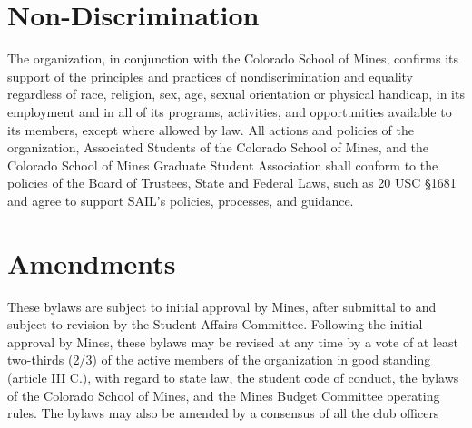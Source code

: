 \documentclass[12pt]{article}
\begin{document}
\section{Non-Discrimination}
{
The organization, in conjunction with the Colorado School of Mines, 
confirms its support of the principles and practices of nondiscrimination and equality regardless of race, 
religion, sex, age, sexual orientation or physical handicap, in its employment and in all of its programs, activities, 
and opportunities available to its members, except where allowed by law. All actions and policies of the organization, 
Associated Students of the Colorado School of Mines, 
and the Colorado School of Mines Graduate Student Association shall conform to the policies of the Board of Trustees, 
State and Federal Laws, such as 20 USC §1681 and agree to support SAIL's policies, processes, and guidance.
}

\section{Amendments}
These bylaws are subject to initial approval by Mines, after submittal to and subject to revision by the Student Affairs Committee. 
Following the initial approval by Mines, these bylaws may be revised at any time by a vote of at least two-thirds (2/3) of the active members of the organization in good standing (article III C.), 
with regard to state law, the student code of conduct, the bylaws of the Colorado School of Mines, and the Mines Budget Committee operating rules. 
The bylaws may also be amended by a consensus of all the club officers 
\end{document}
